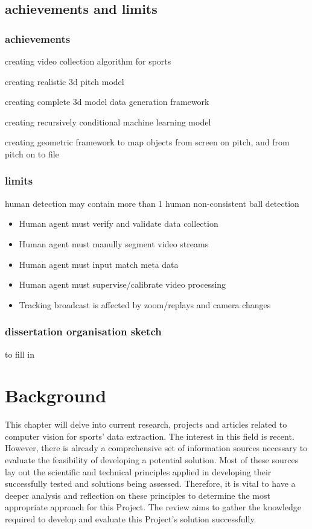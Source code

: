 \documentclass[
11pt,
twoside
]{report}
\begin{document}
\section{achievements and limits}

\subsection{achievements}

creating video collection algorithm for sports

creating realistic 3d pitch model

creating complete 3d model data generation framework

creating recursively conditional machine learning model

creating geometric framework to map objects from screen on pitch, and from pitch on to file



\subsection{limits}

human detection may contain more than 1 human non-consistent ball
detection

\begin{itemize}
\item
  Human agent must verify and validate data collection
\item
  Human agent must manully segment video streams
\item
  Human agent must input match meta data
\item
  Human agent must supervise/calibrate video processing
\item
  Tracking broadcast is affected by zoom/replays and camera changes
\end{itemize}



\subsection{dissertation organisation sketch}


to fill in


\chapter{Background}


This chapter will delve into current research, projects and articles related to computer vision for sports' data extraction. The interest in this field is recent. However, there is already a comprehensive set of information sources necessary to evaluate the feasibility of developing a potential solution. Most of these sources lay out the scientific and technical principles applied in developing their successfully tested and solutions being assessed. Therefore, it is vital to have a deeper analysis and reflection on these principles to determine the most appropriate approach for this Project. The review aims to gather the knowledge required to develop and evaluate this Project's solution successfully.
\end{document}
